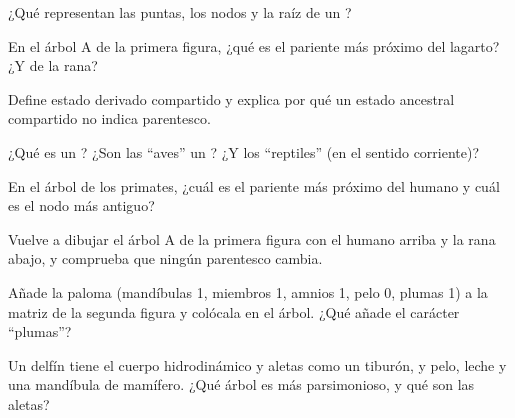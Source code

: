 \begin{exercise}[$\star$]\label{exo:g12:phylogenetic-trees:1}
¿Qué representan las puntas, los nodos y la raíz de un ?
\end{exercise}

\begin{exercise}[$\star$]\label{exo:g12:phylogenetic-trees:2}
En el árbol A de la primera figura, ¿qué  es el pariente más
próximo del lagarto? ¿Y de la rana?
\end{exercise}

\begin{exercise}[$\star$]\label{exo:g12:phylogenetic-trees:3}
Define estado derivado compartido y explica por qué un estado ancestral
compartido no indica parentesco.
\end{exercise}

\begin{exercise}[$\star$]\label{exo:g12:phylogenetic-trees:4}
¿Qué es un ? ¿Son las ``aves'' un ? ¿Y los ``reptiles'' (en
el sentido corriente)?
\end{exercise}

\begin{exercise}[$\star$]\label{exo:g12:phylogenetic-trees:5}
En el árbol de los primates, ¿cuál es el pariente más próximo del
humano y cuál es el nodo más antiguo?
\end{exercise}

\begin{exercise}[$\star\star$]\label{exo:g12:phylogenetic-trees:6}
Vuelve a dibujar el árbol A de la primera figura con el humano arriba y
la rana abajo, y comprueba que ningún parentesco cambia.
\end{exercise}

\begin{exercise}[$\star\star$]\label{exo:g12:phylogenetic-trees:7}
Añade la paloma (mandíbulas 1, miembros 1, amnios 1, pelo 0, plumas 1)
a la matriz de la segunda figura y colócala en el árbol. ¿Qué añade el
carácter ``plumas''?
\end{exercise}

\begin{exercise}[$\star\star$]\label{exo:g12:phylogenetic-trees:8}
Un delfín tiene el cuerpo hidrodinámico y aletas como un tiburón, y
pelo, leche y una mandíbula de mamífero. ¿Qué árbol es más
parsimonioso, y qué son las aletas?
\end{exercise}

